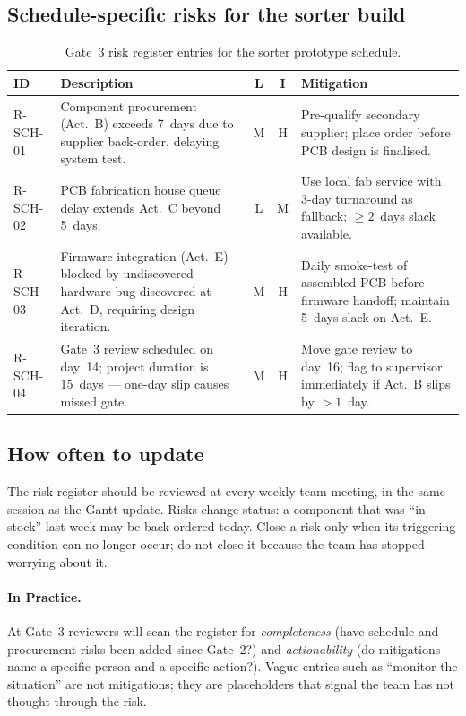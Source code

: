 \subsection{Schedule-specific risks for the sorter build}

\begin{table}[h]
  \centering
  \caption{Gate~3 risk register entries for the sorter prototype schedule.}
  \label{tab:riskregister}
  \begin{tabular}{p{1.2cm}p{4.5cm}ccp{4.5cm}}
    \hline
    \textbf{ID} & \textbf{Description} &
    \textbf{L} & \textbf{I} & \textbf{Mitigation} \\
    \hline
    R-SCH-01 &
    Component procurement (Act.~B) exceeds 7~days due to supplier
    back-order, delaying system test. &
    M & H &
    Pre-qualify secondary supplier; place order before PCB design
    is finalised. \\[4pt]
    R-SCH-02 &
    PCB fabrication house queue delay extends Act.~C beyond 5~days. &
    L & M &
    Use local fab service with 3-day turnaround as fallback;
    $\geq 2$~days slack available. \\[4pt]
    R-SCH-03 &
    Firmware integration (Act.~E) blocked by undiscovered hardware
    bug discovered at Act.~D, requiring design iteration. &
    M & H &
    Daily smoke-test of assembled PCB before firmware handoff;
    maintain 5~days slack on Act.~E. \\[4pt]
    R-SCH-04 &
    Gate~3 review scheduled on day~14; project duration is 15~days
    — one-day slip causes missed gate. &
    M & H &
    Move gate review to day~16; flag to supervisor immediately if
    Act.~B slips by $>1$~day. \\
    \hline
  \end{tabular}
\end{table}

\subsection{How often to update}

The risk register should be reviewed at every weekly team meeting, in the same session as the Gantt update.
Risks change status: a component that was ``in stock'' last week may
be back-ordered today.
Close a risk only when its triggering condition can no longer occur;
do not close it because the team has stopped worrying about it.

\paragraph{In Practice.}
At Gate~3 reviewers will scan the register for \emph{completeness}
(have schedule and procurement risks been added since Gate~2?) and
\emph{actionability} (do mitigations name a specific person and a
specific action?).
Vague entries such as ``monitor the situation'' are not mitigations;
they are placeholders that signal the team has not thought through
the risk.

